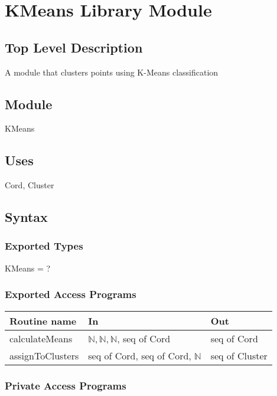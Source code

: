 \documentclass[12pt]{article}
\begin{document}
\newpage

\section*{KMeans Library Module}

\subsection* {Top Level Description}

A module that clusters points using K-Means classification

\subsection*{Module}

KMeans

\subsection* {Uses}

Cord, Cluster

\subsection* {Syntax}

\subsubsection* {Exported Types}

KMeans = ?

\subsubsection* {Exported Access Programs}

\begin{tabular}{| l | l | l |}
\hline
\textbf{Routine name} & \textbf{In} & \textbf{Out}\\
\hline
calculateMeans & $\mathbb{N}, \mathbb{N}, \mathbb{N}$, seq of Cord & seq of Cord\\
\hline
assignToClusters & seq of Cord, seq of Cord, $\mathbb{N}$ & seq of Cluster\\
\hline
\end{tabular}

\subsubsection* {Private Access Programs}
\end{document}
